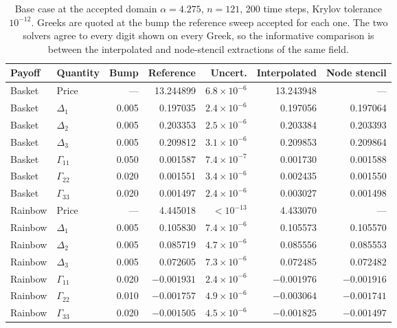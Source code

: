 \begin{table}[htbp!]
\centering
\caption{Base case at the accepted domain $\alpha = 4.275$, $n = 121$, 200 time steps, Krylov tolerance $10^{-12}$. Greeks are quoted at the bump the reference sweep accepted for each one. The two solvers agree to every digit shown on every Greek, so the informative comparison is between the interpolated and node-stencil extractions of the same field.}
\label{tab:fin-base}
\begin{tabular}{@{}llrrrrr@{}}
\toprule
\textbf{Payoff} & \textbf{Quantity} & \textbf{Bump} & \textbf{Reference} & \textbf{Uncert.} & \textbf{Interpolated} & \textbf{Node stencil} \\
\midrule
Basket  & Price          & ---   & 13.244899 & $6.8\times10^{-6}$ & 13.243948 & --- \\
Basket  & $\Delta_1$     & 0.005 & 0.197035  & $2.4\times10^{-6}$ & 0.197056  & 0.197064 \\
Basket  & $\Delta_2$     & 0.005 & 0.203353  & $2.5\times10^{-6}$ & 0.203384  & 0.203393 \\
Basket  & $\Delta_3$     & 0.005 & 0.209812  & $3.1\times10^{-6}$ & 0.209853  & 0.209864 \\
Basket  & $\Gamma_{11}$  & 0.050 & 0.001587  & $7.4\times10^{-7}$ & 0.001730  & 0.001588 \\
Basket  & $\Gamma_{22}$  & 0.020 & 0.001551  & $3.4\times10^{-6}$ & 0.002435  & 0.001550 \\
Basket  & $\Gamma_{33}$  & 0.020 & 0.001497  & $2.4\times10^{-6}$ & 0.003027  & 0.001498 \\
\midrule
Rainbow & Price          & ---   & 4.445018  & $<10^{-13}$ & 4.433070 & --- \\
Rainbow & $\Delta_1$     & 0.005 & 0.105830  & $7.4\times10^{-6}$ & 0.105573 & 0.105570 \\
Rainbow & $\Delta_2$     & 0.005 & 0.085719  & $4.7\times10^{-6}$ & 0.085556 & 0.085553 \\
Rainbow & $\Delta_3$     & 0.005 & 0.072605  & $7.3\times10^{-6}$ & 0.072485 & 0.072482 \\
Rainbow & $\Gamma_{11}$  & 0.020 & $-0.001931$ & $2.4\times10^{-6}$ & $-0.001976$ & $-0.001916$ \\
Rainbow & $\Gamma_{22}$  & 0.010 & $-0.001757$ & $4.9\times10^{-6}$ & $-0.003064$ & $-0.001741$ \\
Rainbow & $\Gamma_{33}$  & 0.020 & $-0.001505$ & $4.5\times10^{-6}$ & $-0.001825$ & $-0.001497$ \\
\bottomrule
\end{tabular}
\end{table}

